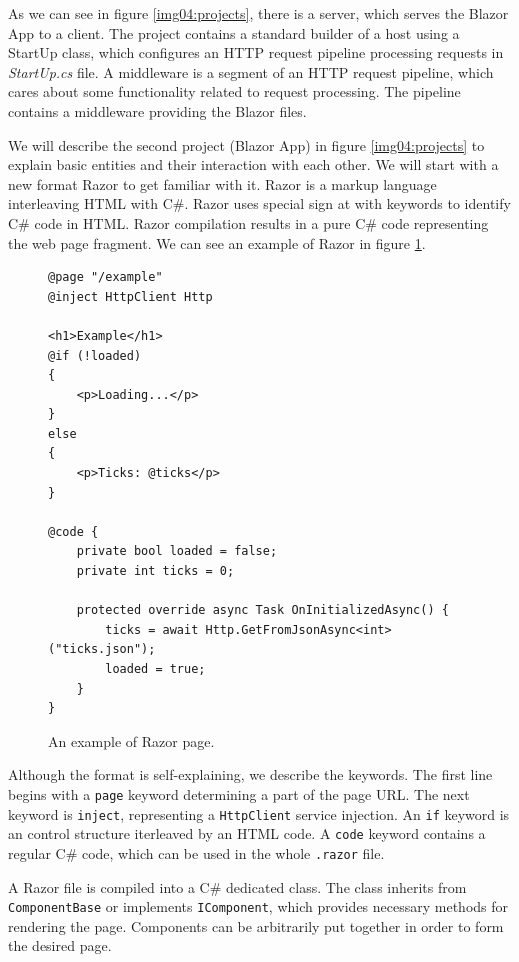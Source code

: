 \par
As we can see in figure \ref{img04:projects}, there is a server, which serves the Blazor App to a client.
The project contains a standard builder of a host using a StartUp class, which configures an HTTP request pipeline processing requests in \textit{StartUp.cs} file.
A middleware is a segment of an HTTP request pipeline, which cares about some functionality related to request processing.
The pipeline contains a middleware providing the Blazor files.
\par
We will describe the second project (Blazor App) in figure \ref{img04:projects} to explain basic entities and their interaction with each other.
We will start with a new format Razor to get familiar with it.
Razor is a markup language interleaving HTML with C\#.
Razor uses special sign at with keywords to identify C\# code in HTML.
Razor compilation results in a pure C\# code representing the web page fragment.
We can see an example of Razor in figure \ref{img05:razor}.
\par
\begin{figure}
\begin{lstlisting}
@page "/example"
@inject HttpClient Http

<h1>Example</h1>
@if (!loaded)
{
    <p>Loading...</p>
}
else
{
    <p>Ticks: @ticks</p>
}

@code {
    private bool loaded = false;
    private int ticks = 0;

    protected override async Task OnInitializedAsync() {
        ticks = await Http.GetFromJsonAsync<int>("ticks.json");
        loaded = true;
    }
}
\end{lstlisting}
\caption{An example of Razor page.}
\label{img05:razor}
\end{figure}
\par
Although the format is self-explaining, we describe the keywords.
The first line begins with a \texttt{page} keyword determining a part of the page URL.
The next keyword is \texttt{inject}, representing a \texttt{HttpClient} service injection. 
An \texttt{if} keyword is an control structure iterleaved by an HTML code.
A \texttt{code} keyword contains a regular C\# code, which can be used in the whole \texttt{.razor} file.
\par
A Razor file is compiled into a C\# dedicated class.
The class inherits from \texttt{ComponentBase} or implements \texttt{IComponent}, which provides necessary methods for rendering the page.
Components can be arbitrarily put together in order to form the desired page.
